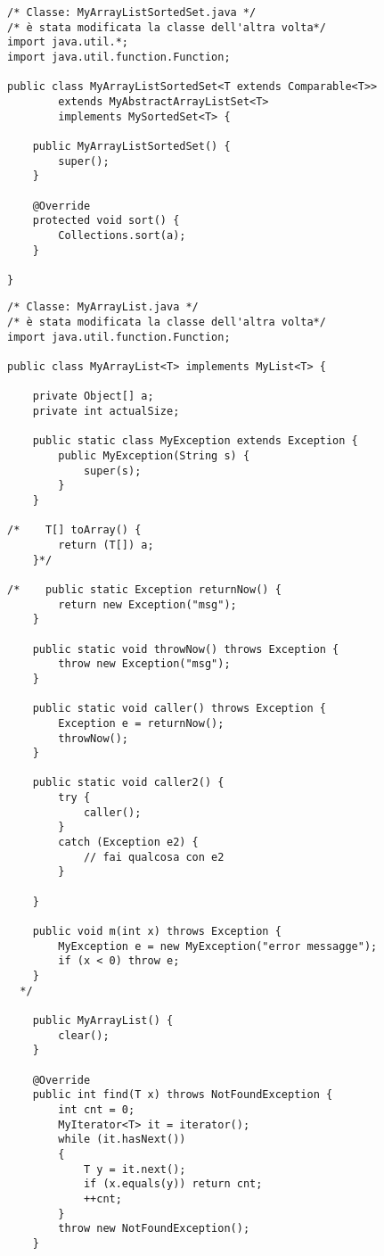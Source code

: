 \begin{lstlisting}[basicstyle=\small,]
/* Classe: MyArrayListSortedSet.java */
/* è stata modificata la classe dell'altra volta*/
import java.util.*;
import java.util.function.Function;

public class MyArrayListSortedSet<T extends Comparable<T>>
        extends MyAbstractArrayListSet<T>
        implements MySortedSet<T> {

    public MyArrayListSortedSet() {
        super();
    }

    @Override
    protected void sort() {
        Collections.sort(a);
    }

}
\end{lstlisting}

\begin{lstlisting}[basicstyle=\small,]
/* Classe: MyArrayList.java */
/* è stata modificata la classe dell'altra volta*/
import java.util.function.Function;

public class MyArrayList<T> implements MyList<T> {

    private Object[] a;
    private int actualSize;

    public static class MyException extends Exception {
        public MyException(String s) {
            super(s);
        }
    }

/*    T[] toArray() {
        return (T[]) a;
    }*/

/*    public static Exception returnNow() {
        return new Exception("msg");
    }

    public static void throwNow() throws Exception {
        throw new Exception("msg");
    }

    public static void caller() throws Exception {
        Exception e = returnNow();
        throwNow();
    }

    public static void caller2() {
        try {
            caller();
        }
        catch (Exception e2) {
            // fai qualcosa con e2
        }

    }

    public void m(int x) throws Exception {
        MyException e = new MyException("error messagge");
        if (x < 0) throw e;
    }
  */

    public MyArrayList() {
        clear();
    }

    @Override
    public int find(T x) throws NotFoundException {
        int cnt = 0;
        MyIterator<T> it = iterator();
        while (it.hasNext())
        {
            T y = it.next();
            if (x.equals(y)) return cnt;
            ++cnt;
        }
        throw new NotFoundException();
    }





\end{lstlisting}
